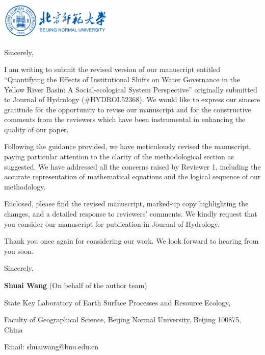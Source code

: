 \documentclass[11pt,a4paper,roman]{moderncv}
\begin{document}
\begin{minipage}[t]{\textwidth}
\includegraphics[width=0.40\textwidth]{bnu}
\end{minipage}


\opening{\vspace*{-2em}}
\closing{Sincerely,}{\vspace*{-2em}}
\makelettertitle
\justify

I am writing to submit the revised version of our manuscript entitled ``Quantifying the Effects of Institutional Shifts on Water Governance in the Yellow River Basin: A Social-ecological System Perspective'' originally submitted to Journal of Hydrology (\#HYDROL52368). We would like to express our sincere gratitude for the opportunity to revise our manuscript and for the constructive comments from the reviewers which have been instrumental in enhancing the quality of our paper.

Following the guidance provided, we have meticulously revised the manuscript, paying particular attention to the clarity of the methodological section as suggested. We have addressed all the concerns raised by Reviewer 1, including the accurate representation of mathematical equations and the logical sequence of our methodology.

Enclosed, please find the revised manuscript, marked-up copy highlighting the changes, and a detailed response to reviewers' comments. We kindly request that you consider our manuscript for publication in Journal of Hydrology.

Thank you once again for considering our work. We look forward to hearing from you soon.

Sincerely,

\textbf{Shuai Wang} (On behalf of the author team)

State Key Laboratory of Earth Surface Processes and Resource Ecology,

Faculty of Geographical Science, Beijing Normal University, Beijing 100875, China

Email: shuaiwang@bnu.edu.cn

\end{document}
